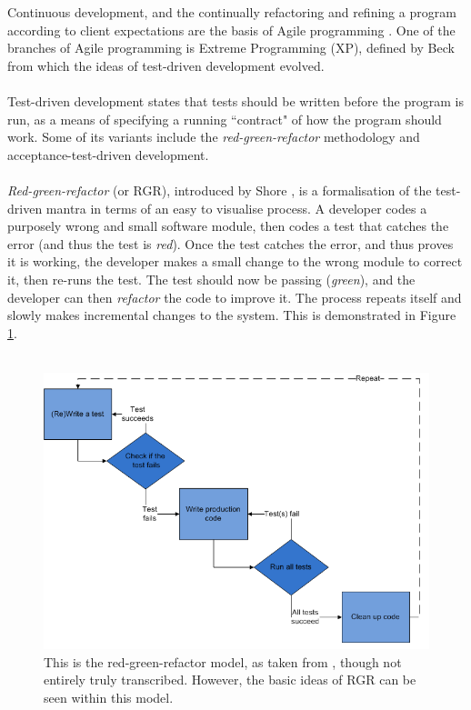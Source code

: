 Continuous development, and the continually refactoring and refining a program according to client
expectations are the basis of Agile programming \cite{sommerville1989software}.
One of the branches of Agile programming is Extreme Programming (XP), defined by Beck
\cite{beck2006extreme} from which the ideas of test-driven development evolved.\\
\\
Test-driven development states that tests should be written before the program is run, as a means of
specifying a running ``contract" of how the program should work.
Some of its variants include the {\em red-green-refactor} methodology and acceptance-test-driven
development.\\
\\
{\em Red-green-refactor} (or RGR), introduced by Shore \cite{shore2005RGR}, is a formalisation of the test-driven mantra in
terms of an easy to visualise process.
A developer codes a purposely wrong and small software module, then codes a test that catches the
error (and thus the test is {\em red}).
Once the test catches the error, and thus proves it is working, the developer makes a small change
to the wrong module to correct it, then re-runs the test.
The test should now be passing ({\em green}), and the developer can then {\em refactor} the code to
improve it.
The process repeats itself and slowly makes incremental changes to the system.
This is demonstrated in Figure \ref{figure:RGR}.\\
\\
\begin{figure}
\centering
\includegraphics{media/Test-driven_development}
\caption{This is the red-green-refactor model, as taken from \cite{RGR:image}, though not entirely
truly transcribed.
However, the basic ideas of RGR can be seen within this model.}
\label{figure:RGR}
\end{figure}

